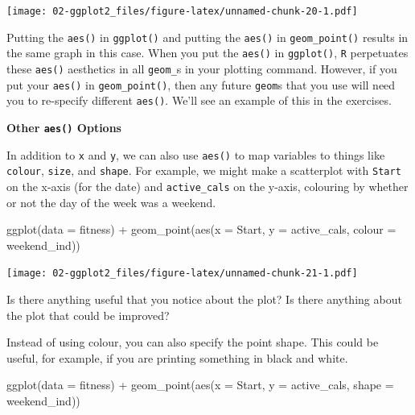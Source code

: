 \documentclass[
]{book}
\newenvironment{Shaded}{\begin{snugshade}}{\end{snugshade}}
\newcommand{\AttributeTok}[1]{\textcolor[rgb]{0.77,0.63,0.00}{#1}}
\newcommand{\FunctionTok}[1]{\textcolor[rgb]{0.00,0.00,0.00}{#1}}
\newcommand{\NormalTok}[1]{#1}
\newcommand{\SpecialCharTok}[1]{\textcolor[rgb]{0.00,0.00,0.00}{#1}}
\begin{document}
\texttt{[image: 02-ggplot2\_files/figure-latex/unnamed-chunk-20-1.pdf]}

Putting the \texttt{aes()} in \texttt{ggplot()} and putting the \texttt{aes()} in \texttt{geom\_point()} results in the same graph in this case. When you put the \texttt{aes()} in \texttt{ggplot()}, \texttt{R} perpetuates these \texttt{aes()} aesthetics in all \texttt{geom\_}s in your plotting command. However, if you put your \texttt{aes()} in \texttt{geom\_point()}, then any future \texttt{geom}s that you use will need you to re-specify different \texttt{aes()}. We'll see an example of this in the exercises.

\textbf{Other \texttt{aes()} Options}

In addition to \texttt{x} and \texttt{y}, we can also use \texttt{aes()} to map variables to things like \texttt{colour}, \texttt{size}, and \texttt{shape}. For example, we might make a scatterplot with \texttt{Start} on the x-axis (for the date) and \texttt{active\_cals} on the y-axis, colouring by whether or not the day of the week was a weekend.

\begin{Shaded}
\begin{Highlighting}[]
\FunctionTok{ggplot}\NormalTok{(}\AttributeTok{data =}\NormalTok{ fitness) }\SpecialCharTok{+}
  \FunctionTok{geom\_point}\NormalTok{(}\FunctionTok{aes}\NormalTok{(}\AttributeTok{x =}\NormalTok{ Start, }\AttributeTok{y =}\NormalTok{ active\_cals, }\AttributeTok{colour =}\NormalTok{ weekend\_ind))}
\end{Highlighting}
\end{Shaded}

\texttt{[image: 02-ggplot2\_files/figure-latex/unnamed-chunk-21-1.pdf]}

Is there anything useful that you notice about the plot? Is there anything about the plot that could be improved?

Instead of using colour, you can also specify the point shape. This could be useful, for example, if you are printing something in black and white.

\begin{Shaded}
\begin{Highlighting}[]
\FunctionTok{ggplot}\NormalTok{(}\AttributeTok{data =}\NormalTok{ fitness) }\SpecialCharTok{+}
  \FunctionTok{geom\_point}\NormalTok{(}\FunctionTok{aes}\NormalTok{(}\AttributeTok{x =}\NormalTok{ Start, }\AttributeTok{y =}\NormalTok{ active\_cals, }\AttributeTok{shape =}\NormalTok{ weekend\_ind))}
\end{Highlighting}
\end{Shaded}
\end{document}
